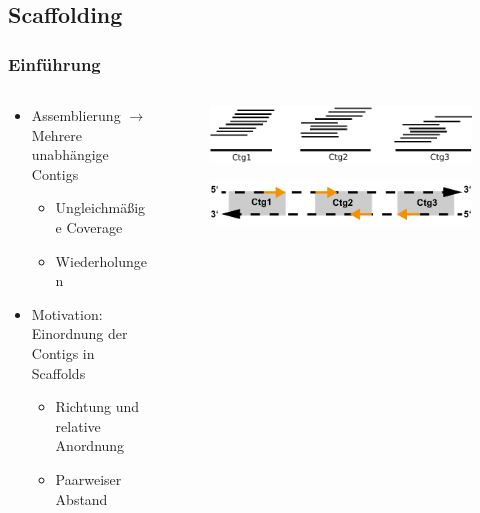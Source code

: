 \documentclass[xcolor=pst]{beamer}
\begin{document}
\subsection{Scaffolding}
\begin{frame}
\setcounter{framenumber}{1}
  \frametitle{Einführung}

  \begin{columns}
    \begin{column}{.45\textwidth}
      \begin{itemize}
      \item Assemblierung $\rightarrow$ Mehrere unabhängige Contigs
      \begin{itemize}
        \item Ungleichmäßige Coverage
        \item Wiederholungen
      \end{itemize}
      \item Motivation: Einordnung der Contigs in Scaffolds
      \begin{itemize}
        \item Richtung und relative Anordnung
        \item Paarweiser Abstand
      \end{itemize}
      \end{itemize}
    \end{column}
    \begin{column}{.45\textwidth}
      \begin{center}
        \begin{figure}[t]
          \includegraphics[width=\textwidth,height=0.8\textheight,keepaspectratio]{figures/Scaffolding.pdf}
        \end{figure}
        \vspace{.75cm}
        \begin{figure}[t]
          \includegraphics[width=\textwidth,height=0.8\textheight,keepaspectratio]{figures/Scaffolding_2.pdf}
        \end{figure}
      \end{center}
    \end{column}
  \end{columns}
  \let\thefootnote\relax{}
\end{frame}
\end{document}
